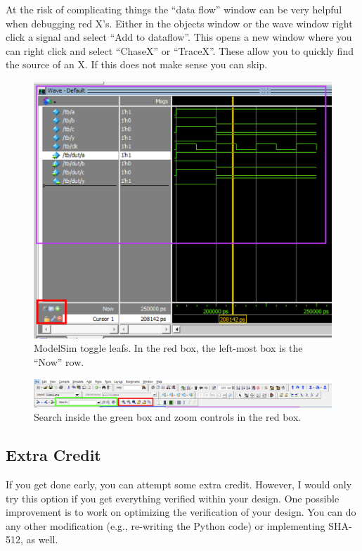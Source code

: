 \documentclass{article}
\begin{document}
At the risk of complicating things the ``data flow'' window can be very
helpful when debugging red X's.  Either in the objects window or the wave
window right click a signal and select ``Add to dataflow''. This opens
a new window where you can right click and select ``ChaseX'' or ``TraceX''.
These allow you to quickly find the source of an X.  If this does not make
sense you can skip.
\begin{figure} [t!]
  \centering
  \includegraphics[scale=0.4]{modelsim-tips1.png}
  \caption{ModelSim toggle leafs. In the red box, the left-most box is the ``Now'' row.}
  \label{modelsim-tips1.png}
\end{figure}
\begin{figure} [t!]
  \centering
  \includegraphics[scale=0.32]{modelsim-tips2.png}
  \caption{Search inside the green box and zoom controls in the red box.}
  \label{modelsim-tips2.png}
\end{figure}

\subsection{Extra Credit}

If you get done early, you can attempt some extra credit.  However, I
would only try this option if you get everything verified within your
design.  
One possible improvement is to work on optimizing the verification
of your design.  You can do any other modification (e.g., re-writing
the Python code) or implementing SHA-512, as well.
\end{document}
